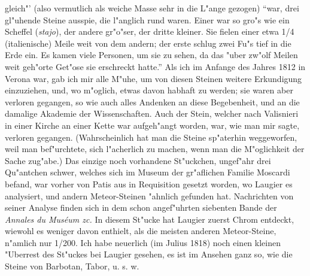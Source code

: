 \documentclass[a4paper, 11pt, oneside, polutonikogreek, german]{article}
\begin{document}
gleich"' (also vermutlich als weiche Masse sehr in die L"ange gezogen) "`war, drei gl"uhende Steine ausspie, die l"anglich rund waren. Einer war so gro"s wie ein Scheffel (\emph{stajo}), der andere gr"o"ser, der dritte kleiner. Sie fielen einer etwa 1/4 (italienische) Meile weit von dem andern; der erste schlug zwei Fu"s tief in die Erde ein. Es kamen viele Personen, um sie zu sehen, da das "uber zw"olf Meilen weit geh"orte Get"ose sie erschreckt hatte."' Als ich im Anfange des Jahres 1812 in Verona war, gab ich mir alle M"uhe, um von diesen Steinen weitere Erkundigung einzuziehen, und, wo m"oglich, etwas davon habhaft zu werden; sie waren aber verloren gegangen, so wie auch alles Andenken an diese Begebenheit, und an die damalige Akademie der Wissenschaften. Auch der Stein, welcher nach Valisnieri in einer Kirche an einer Kette war aufgeh"angt worden, war, wie man mir sagte, verloren gegangen. (Wahrscheinlich hat man die Steine sp"aterhin weggeworfen, weil man bef"urchtete, sich l"acherlich zu machen, wenn man die M"oglichkeit der Sache zug"abe.) Das einzige noch vorhandene St"uckchen, ungef"ahr drei Qu"antchen schwer, welches sich im Museum der gr"aflichen Familie Moscardi befand, war vorher von Patis aus in Requisition gesetzt worden, wo Laugier es analysiert, und andern Meteor-Steinen "ahnlich gefunden hat. Nachrichten von seiner Analyse finden sich in dem schon angef"uhrten siebenten Bande der \emph{Annales du Muséum zc.} In diesem St"ucke hat Laugier zuerst Chrom entdeckt, wiewohl es weniger davon enthielt, als die meisten anderen Meteor-Steine, n"amlich nur 1/200. Ich habe neuerlich (im Julius 1818) noch einen kleinen "Uberrest des St"uckes bei Laugier gesehen, es ist im Ansehen ganz so, wie die Steine von Barbotan, Tabor, u. s. w.
\end{document}
